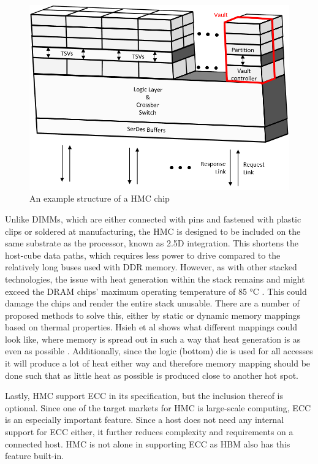 \begin{figure}[!ht]
\centering
\includegraphics[width=0.75\linewidth]{figure/HMC_structures.png}
\caption{An example structure of a HMC chip }
\label{HMC-structure}
\end{figure}

Unlike DIMMs, which are either connected with pins and fastened with plastic clips or soldered at manufacturing, the HMC is designed to be included on the same substrate as the processor, known as 2.5D integration. This shortens the host-cube data paths, which requires less power to drive compared to the relatively long buses used with DDR memory. However, as with other stacked technologies, the issue with heat generation within the stack remains and might exceed the DRAM chips' maximum operating temperature of 85 °C \cite{7459470}. This could damage the chips and render the entire stack unusable. There are a number of proposed methods to solve this, either by static or dynamic memory mappings based on thermal properties. Hsieh et al shows what different mappings could look like, where memory is spread out in such a way that heat generation is as even as possible \cite{Hsieh:2013:TMM:2501626.2512457}. Additionally, since the logic (bottom) die is used for all accesses it will produce a lot of heat either way and therefore memory mapping should be done such that as little heat as possible is produced close to another hot spot.
\bigskip

Lastly, HMC support ECC in its specification, but the inclusion thereof is optional. Since one of the target markets for HMC is large-scale computing, ECC is an especially important feature. Since a host does not need any internal support for ECC either, it further reduces complexity and requirements on a connected host. HMC is not alone in supporting ECC as HBM also has this feature built-in.

